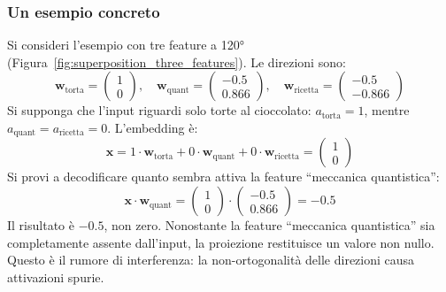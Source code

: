 \subsubsection{Un esempio concreto}
Si consideri l'esempio con tre feature a 120° (Figura~\ref{fig:superposition_three_features}). Le direzioni sono:
\begin{equation}
    \mathbf{w}_{\text{torta}} = \begin{pmatrix} 1 \\ 0 \end{pmatrix}, \quad
    \mathbf{w}_{\text{quant}} = \begin{pmatrix} -0.5 \\ 0.866 \end{pmatrix}, \quad
    \mathbf{w}_{\text{ricetta}} = \begin{pmatrix} -0.5 \\ -0.866 \end{pmatrix}
\end{equation}
Si supponga che l'input riguardi solo torte al cioccolato: $a_{\text{torta}} = 1$, mentre $a_{\text{quant}} = a_{\text{ricetta}} = 0$. L'embedding è:
\begin{equation}
    \mathbf{x} = 1 \cdot \mathbf{w}_{\text{torta}} + 0 \cdot \mathbf{w}_{\text{quant}} + 0 \cdot \mathbf{w}_{\text{ricetta}} = \begin{pmatrix} 1 \\ 0 \end{pmatrix}
\end{equation}
Si provi a decodificare quanto sembra attiva la feature ``meccanica quantistica'':
\begin{equation}
    \mathbf{x} \cdot \mathbf{w}_{\text{quant}} = \begin{pmatrix} 1 \\ 0 \end{pmatrix} \cdot \begin{pmatrix} -0.5 \\ 0.866 \end{pmatrix} = -0.5
\end{equation}
Il risultato è $-0.5$, non zero. Nonostante la feature ``meccanica quantistica'' sia completamente assente dall'input, la proiezione restituisce un valore non nullo. Questo è il rumore di interferenza: la non-ortogonalità delle direzioni causa attivazioni spurie.
